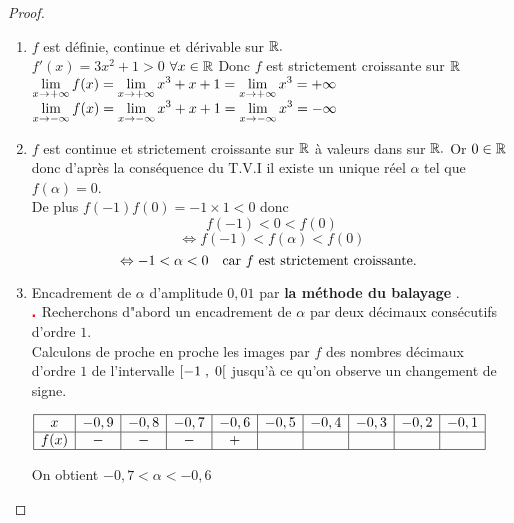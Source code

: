 \begin{proof}
 \begin{enumerate}
\item $ f $ est définie, continue et dérivable sur $ \mathbb{R}. $\\
$ f'(x) = 3x^{2}+1 > 0$  $\forall x\in \mathbb{R} $ Donc $ f $ est strictement croissante  sur $ \mathbb{R} $ \\
$ \displaystyle\lim_{x \to +\infty}f(x)=\displaystyle \lim_{x \to +\infty}x^{3}+x+1=\displaystyle\lim_{x \to +\infty}x^{3}=+\infty$\\
$\displaystyle \lim_{x \to -\infty}f(x)=\displaystyle \lim_{x \to -\infty}x^{3}+x+1=\displaystyle\lim_{x \to -\infty}x^{3}=-\infty$



\item $ f $ est continue et strictement croissante sur $ \mathbb{R}$ à valeurs dans sur $ \mathbb{R}. $ Or $ 0\in \mathbb{R} $ donc d'après la conséquence  du T.V.I il existe un unique réel $ \alpha $ tel que $ f(\alpha)=0 $.\\ De plus $ f(-1)f(0)=-1\times 1 < 0$ donc $$  f(-1)<0<f(0) $$ $$ \Leftrightarrow f(-1)<f(\alpha)<f(0) $$ $$ \Leftrightarrow -1<\alpha< 0 \quad \textrm{car $ f $ est strictement croissante. }$$
\item Encadrement de $ \alpha $ d'amplitude $ 0,01 $ par \textbf{la méthode du balayage }.\\
$ \color{red}\centerdot $ Recherchons d"abord un encadrement de $ \alpha $ par deux décimaux consécutifs d'ordre $ 1. $\\
Calculons de proche en proche les images par $ f $  des nombres décimaux d'ordre $ 1 $ de l'intervalle $ \left[-1 \;,\; 0\right[ $ jusqu'à ce qu'on observe un changement de signe.


\renewcommand{\arraystretch}{1}
$\begin{array}{|c|c|c|c|c|c|c|c|c|c|}
\hline 
x &-0,9  &-0,8 & -0,7 &- 0,6 & -0,5 & -0,4 &-0,3 &-0,2& -0,1  \\
\hline
f(x) &-  & -  &  - &  +  &  &  &  &  &  \\
\hline
\end{array}$

\vspace{0.5cm}   On obtient $-0,7<\alpha< - 0,6  $



\end{enumerate}
\end{proof}
